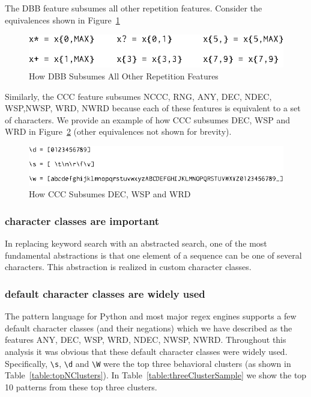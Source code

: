 The DBB feature subsumes all other repetition features.  Consider the equivalences shown in Figure~\ref{fig:DBBequivalences}

\begin{figure}[htb]
\centering
\includegraphics[width=\columnwidth]{../illustrations/DBBequivalences.eps}
\caption{How DBB Subsumes All Other Repetition Features}
\label{fig:DBBequivalences}
\end{figure}

Similarly, the CCC feature subsumes NCCC, RNG, ANY, DEC, NDEC, WSP,NWSP, WRD, NWRD because each of these features is equivalent to a set of characters.  We provide an example of how CCC subsumes DEC, WSP and WRD in Figure~\ref{fig:CCCequivalences} (other equivalences not shown for brevity).

\begin{figure}[htb]
\centering
\includegraphics[width=\columnwidth]{../illustrations/CCCequivalences.eps}
\caption{How CCC Subsumes DEC, WSP and WRD}
\label{fig:CCCequivalences}
\end{figure}

\subsubsection{character classes are important}
In replacing keyword search with an abstracted search, one of the most fundamental abstractions is that one element of a sequence can be one of several characters.  This abstraction is realized in custom character classes.

\subsubsection{default character classes are widely used}

The pattern language for Python and most major regex engines supports a few default character classes (and their negations) which we have described as the features ANY, DEC, WSP, WRD, NDEC, NWSP, NWRD.  Throughout this analysis it was obvious that these default character classes were widely used. Specifically, \verb!\s!, \verb!\d! and \verb!\W! were the top three behavioral clusters (as shown in Table~\ref{table:topNClusters}).  In Table~\ref{table:threeClusterSample} we show the top 10 patterns from these top three clusters.

